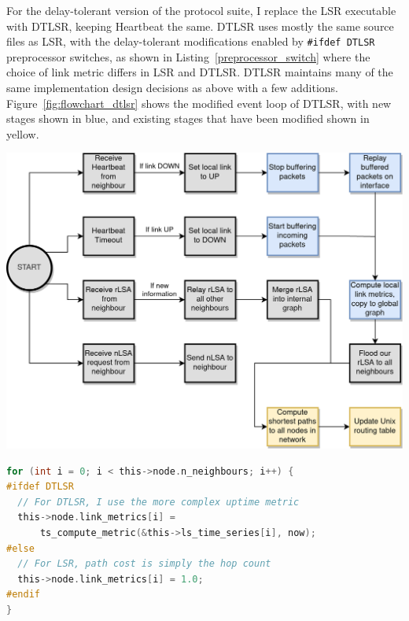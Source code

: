 \documentclass[withindex,glossary,openany]{cam-thesis}
\begin{document}
For the delay-tolerant version of the protocol suite, I replace the LSR executable with DTLSR, keeping Heartbeat the same. DTLSR uses mostly the same source files as LSR, with the delay-tolerant modifications enabled by \texttt{\#ifdef DTLSR} preprocessor switches, as shown in Listing~\ref{preprocessor_switch} where the choice of link metric differs in LSR and DTLSR. DTLSR maintains many of the same implementation design decisions as above with a few additions. Figure~\ref{fig:flowchart_dtlsr} shows the modified event loop of DTLSR, with new stages shown in blue, and existing stages that have been modified shown in yellow.

\begin{center}
\begin{minipage}{0.9\textwidth} \centering
	\includegraphics[width=1\textwidth]{flowchart_dtlsr}
	\label{fig:flowchart_dtlsr}
\end{minipage}
\end{center}

\begin{minipage}{1\textwidth} \centering
\begin{lstlisting}[language=C, label=preprocessor_switch, frame=tb, caption=Example of preprocessor switch for DTLSR modifications]
for (int i = 0; i < this->node.n_neighbours; i++) {
#ifdef DTLSR
  // For DTLSR, I use the more complex uptime metric
  this->node.link_metrics[i] =
      ts_compute_metric(&this->ls_time_series[i], now);
#else
  // For LSR, path cost is simply the hop count
  this->node.link_metrics[i] = 1.0;
#endif
}
\end{lstlisting}
\end{minipage}
\end{document}
